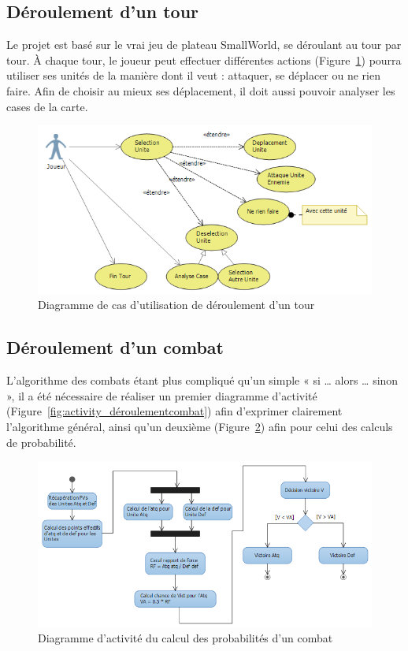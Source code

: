 \documentclass[a4paper]{article}%
\begin{document}
\newpage

\subsection{Déroulement d'un tour}
Le projet est basé sur le vrai jeu de plateau SmallWorld, se déroulant au tour par tour. À chaque tour, le joueur peut effectuer différentes actions (Figure~\ref{fig:use_case_déroulementtour}) pourra utiliser ses unités de la manière dont il veut : attaquer, se déplacer ou ne rien faire. Afin de choisir au mieux ses déplacement, il doit aussi pouvoir analyser les cases de la carte.

\begin{figure}[H]
   \centering
   \includegraphics[width=\textwidth]{./images/use_case/DiagUseCaseTour.png}
                \caption{Diagramme de cas d'utilisation de déroulement d'un tour}
                \label{fig:use_case_déroulementtour}
\end{figure}

\newpage

\subsection{Déroulement d'un combat}
L'algorithme des combats étant plus compliqué qu'un simple « si … alors … sinon », il a été nécessaire de réaliser un premier diagramme d'activité (Figure~\ref{fig:activity_déroulementcombat}) afin d'exprimer clairement l'algorithme général, ainsi qu'un deuxième (Figure~\ref{fig:activity_probabilitéscombat}) afin pour celui des calculs de probabilité.

\begin{figure}[H]
    \centering
    \includegraphics[width=\textwidth]{./images/activity/DiagActivityCombat2.png}
                \caption{Diagramme d'activité du calcul des probabilités d'un combat}
                \label{fig:activity_probabilitéscombat}
\end{figure}
\end{document}
